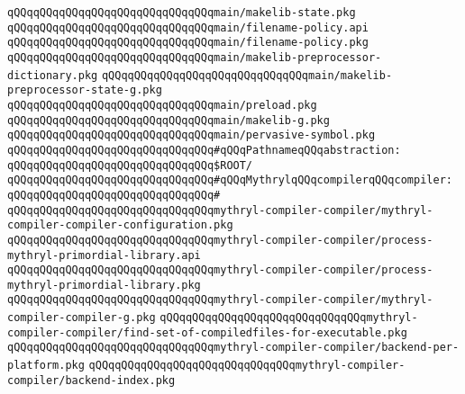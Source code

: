 \verb|qQQqqQQqqQQqqQQqqQQqqQQqqQQqqQQqmain/makelib-state.pkg|\newline
\verb|qQQqqQQqqQQqqQQqqQQqqQQqqQQqqQQqmain/filename-policy.api|\newline
\verb|qQQqqQQqqQQqqQQqqQQqqQQqqQQqqQQqmain/filename-policy.pkg|\newline
\verb|qQQqqQQqqQQqqQQqqQQqqQQqqQQqqQQqmain/makelib-preprocessor-dictionary.pkg|\newline
\verb|qQQqqQQqqQQqqQQqqQQqqQQqqQQqqQQqmain/makelib-preprocessor-state-g.pkg|\newline
\verb|qQQqqQQqqQQqqQQqqQQqqQQqqQQqqQQqmain/preload.pkg|\newline
\verb|qQQqqQQqqQQqqQQqqQQqqQQqqQQqqQQqmain/makelib-g.pkg|\newline
\verb|qQQqqQQqqQQqqQQqqQQqqQQqqQQqqQQqmain/pervasive-symbol.pkg|\newline
\newline
\verb|qQQqqQQqqQQqqQQqqQQqqQQqqQQqqQQq#qQQqPathnameqQQqabstraction:|\newline
\verb|qQQqqQQqqQQqqQQqqQQqqQQqqQQqqQQq$ROOT/|\newline
\newline
\verb|qQQqqQQqqQQqqQQqqQQqqQQqqQQqqQQq#qQQqMythrylqQQqcompilerqQQqcompiler:|\newline
\verb|qQQqqQQqqQQqqQQqqQQqqQQqqQQqqQQq#|\newline
\verb|qQQqqQQqqQQqqQQqqQQqqQQqqQQqqQQqmythryl-compiler-compiler/mythryl-compiler-compiler-configuration.pkg|\newline
\verb|qQQqqQQqqQQqqQQqqQQqqQQqqQQqqQQqmythryl-compiler-compiler/process-mythryl-primordial-library.api|\newline
\verb|qQQqqQQqqQQqqQQqqQQqqQQqqQQqqQQqmythryl-compiler-compiler/process-mythryl-primordial-library.pkg|\newline
\verb|qQQqqQQqqQQqqQQqqQQqqQQqqQQqqQQqmythryl-compiler-compiler/mythryl-compiler-compiler-g.pkg|\newline
\verb|qQQqqQQqqQQqqQQqqQQqqQQqqQQqqQQqmythryl-compiler-compiler/find-set-of-compiledfiles-for-executable.pkg|\newline
\verb|qQQqqQQqqQQqqQQqqQQqqQQqqQQqqQQqmythryl-compiler-compiler/backend-per-platform.pkg|\newline
\verb|qQQqqQQqqQQqqQQqqQQqqQQqqQQqqQQqmythryl-compiler-compiler/backend-index.pkg|\newline
\newline
